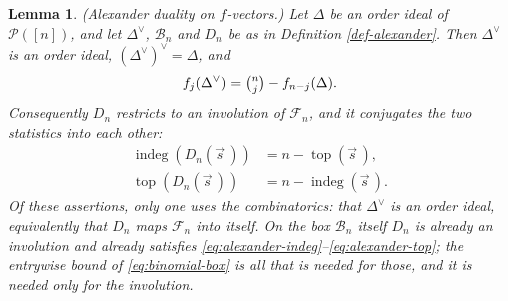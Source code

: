 \documentclass[11pt, a4paper, abstract=yes]{scrartcl}
\theoremstyle{definition}
\theoremstyle{remark}
\theoremstyle{plain}
\newtheorem{lemma}[definition]{Lemma}
\newcommand{\indeg}{\operatorname{indeg}}
\newcommand{\tp}{\operatorname{top}}
\begin{document}
\begin{lemma}
(\emph{Alexander duality on \(f\)-vectors.}) Let \(\Delta\) be an order ideal of \(\mathcal P([n])\),
and let \(\Delta^{\vee}\), \(\mathcal B_n\) and \(D_n\) be as in Definition \ref{def-alexander}.
Then \(\Delta^{\vee}\) is an order ideal, \((\Delta^{\vee})^{\vee}=\Delta\), and
\begin{equation}\label{eq:alexander-f}
  f_j(\Delta^{\vee})=\tbinom nj-f_{n-j}(\Delta).
\end{equation}
Consequently \(D_n\) restricts to an involution of \(\mathcal F_n\), and it conjugates the two
statistics into each other:
\begin{align}
  \indeg(D_n(\vec s\,)) &= n-\tp(\vec s\,),\label{eq:alexander-indeg}\\
  \tp(D_n(\vec s\,)) &= n-\indeg(\vec s\,).\label{eq:alexander-top}
\end{align}
Of these assertions, only one uses the combinatorics: that \(\Delta^{\vee}\) is an order ideal,
equivalently that \(D_n\) maps \(\mathcal F_n\) into itself. On the box \(\mathcal B_n\) itself
\(D_n\) is already an involution and already satisfies
\eqref{eq:alexander-indeg}--\eqref{eq:alexander-top}; the entrywise bound of
\eqref{eq:binomial-box} is all that is needed for those, and it is needed only for the
involution.
\label{lem-alexander}
\end{lemma}
\end{document}
